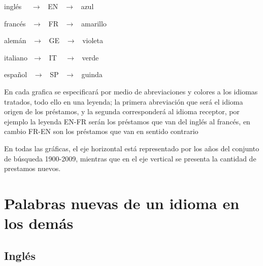 \hfill\break

inglés   $\,\,\,\,\,\, \rightarrow \,\,\,$   EN   $\,\,\,\rightarrow\,\,\,$  azul

francés  $\,\,\,       \rightarrow \,\,\,$   FR   $\,\,\,\rightarrow\,\,\,$  amarillo

alemán   $\,\,\,       \rightarrow \,\,\,$   GE   $\,\,\,\rightarrow\,\,\,$  violeta

italiano $\,\,          \rightarrow \,\,\,$  IT   $\,\,\,\,\,\rightarrow\,\,\,$  verde

español  $\,\,\,       \rightarrow \,\,\,$  SP   $\,\,\,\rightarrow\,\,\,$  guinda

\hfill\break


En cada grafica se especificará por medio de  abreviaciones y  colores a los idiomas tratados, todo ello en una leyenda; la primera abreviación que será el idioma origen de los préstamos, y la segunda corresponderá al idioma receptor, por ejemplo  la leyenda EN-FR serán los préstamos que van del inglés al francés, en cambio FR-EN son los préstamos que van en sentido contrario

En todas las gráficas, el eje horizontal está representado por los años del conjunto de búsqueda 1900-2009,  mientras que en el eje vertical se presenta la cantidad de prestamos nuevos. 





\newpage
\section{Palabras nuevas de un idioma en los demás}

\subsection{Inglés}

